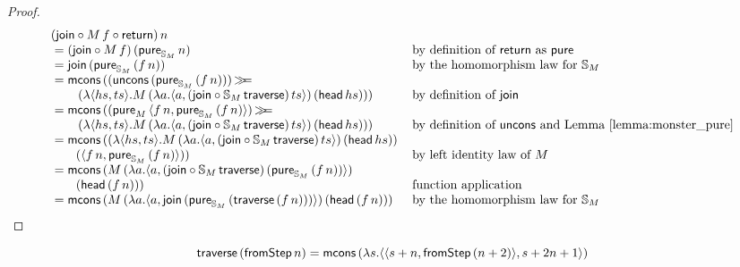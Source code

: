 \begin{proof}
$$
\begin{array}{ll}
(\join \comp  M\, f \comp \return)\, n \\
{}= (\join \comp  M\, f)\, (\apure_{\stream{M}}\, n)
  & \mbox{by definition of } \return \mbox{ as } \apure \\
{}= \join\, (\apure_{\stream{M}}\, (f \,n))
  & \mbox{by the homomorphism law for } \stream{M}\\
{}= \mcons\, ((\uncons\, (\apure_{\stream{M}}\, (f\, n)))\, \bind \\\qquad \,(\lambda \pair{hs}{ts} . M\,(\lambda a . \pair{a}{(\join \comp \stream{M}\,\mathsf{traverse})\, ts})\, (\head\, hs)))
  & \mbox{by definition of } \join \\
{}= \mcons\,((\apure_{M}\,\pair{f\, n}{\apure_{\stream{M}}\,(f\, n)})\, \bind \\\qquad \,(\lambda \pair{hs}{ts} . M\,(\lambda a . \pair{a}{(\join \comp \stream{M}\, \mathsf{traverse})\, ts})\, (\head\, hs)))
  & \mbox{by definition of } \uncons \mbox{ and Lemma \ref{lemma:monster_pure}}\\
{}= \mcons\, ((\lambda \pair{hs}{ts} . M\,(\lambda a . \pair{a}{(\join \comp \stream{M}\,\mathsf{traverse})\, ts})\, (\head\, hs)) \, \\\qquad (\pair{f\, n}{\apure_{\stream{M}}\,(f\, n)}))
  & \mbox{by left identity law of } M \\
{}= \mcons\,(M\,(\lambda a . \pair{a}{(\join \comp \stream{M}\,\mathsf{traverse})\, (\apure_{\stream{M}}\,(f\, n))})\, \\ \qquad (\head\, (f\, n)))
 & \mbox{function application} \\
 {}= \mcons\, (M\,(\lambda a . \pair{a}{\join\, (\apure_{\stream{M}}\, (\mathsf{traverse}\, (f\, n)))})\, (\head\, (f\, n)))
 & \mbox{by the homomorphism law for } \stream{M}\\

\end{array} 
$$
\end{proof}


\begin{lemmaa}{19}\label{lemma:traverse_fromstepstr}
$$
\mathsf{traverse}\, (\mathsf{fromStep}\, n) = \mathsf{mcons}\, (\lambda s . \langle \langle s+n, \mathsf{fromStep}\, (n + 2) \rangle, s + 2n + 1 \rangle)
$$
\end{lemmaa} 

